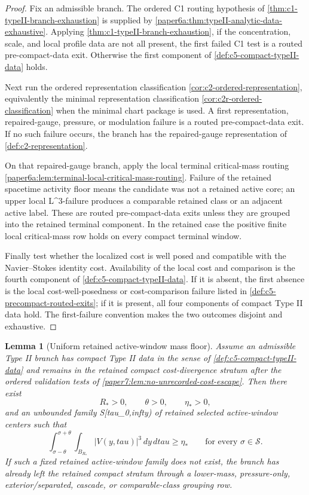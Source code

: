 \documentclass[11pt]{amsart}
\def\({}%
\def\){}%
\def\tau{tau}%
\def\infty{infty}%
\theoremstyle{plain}
\newtheorem{lemma}[lemma]{Lemma}
\theoremstyle{definition}
\theoremstyle{remark}
\begin{document}
\begin{proof}
Fix an admissible branch.  The ordered C1 routing hypothesis of
\cref{thm:c1-typeII-branch-exhaustion} is supplied by
\cref{paper6a:thm:typeII-analytic-data-exhaustive}.  Applying
\cref{thm:c1-typeII-branch-exhaustion}, if the concentration, scale, and local
profile data are not all present, the first failed C1 test is a routed
pre-compact-data exit.  Otherwise the first component of
\cref{def:c5-compact-typeII-data} holds.

Next run the ordered representation classification
\cref{cor:c2-ordered-representation}, equivalently the minimal representation
classification \cref{cor:c2r-ordered-classification} when the minimal chart
package is used.  A first representation, repaired-gauge, pressure, or
modulation failure is a routed pre-compact-data exit.  If no such failure
occurs, the branch has the repaired-gauge representation of
\cref{def:c2-representation}.

On that repaired-gauge branch, apply the local terminal critical-mass routing
\cref{paper6a:lem:terminal-local-critical-mass-routing}.  Failure of the
retained spacetime activity floor means the candidate was not a retained active
core; an upper local
\(L^3\)-failure produces a comparable retained class or an adjacent active
label.  These are routed pre-compact-data exits unless they are grouped into
the retained terminal component.  In the retained case the positive finite
local critical-mass row holds on every compact terminal window.

Finally test whether the localized cost is well posed and compatible with the
Navier--Stokes identity cost.  Availability of the local cost and comparison is
the fourth component of \cref{def:c5-compact-typeII-data}.  If it is absent,
the first absence is the local cost-well-posedness or cost-comparison failure
listed in \cref{def:c5-precompact-routed-exits}; if it is present, all four
components of compact Type II data hold.  The first-failure convention makes
the two outcomes disjoint and exhaustive.
\end{proof}

\begin{lemma}[Uniform retained active-window mass floor]
\label{lem:c5-uniform-retained-active-window-mass}
Assume an admissible Type II branch has compact Type II data in the sense of
\cref{def:c5-compact-typeII-data} and remains in the retained compact
cost-divergence stratum after the ordered validation tests of
\cref{paper7:lem:no-unrecorded-cost-escape}.  Then there exist
\[
  R_*>0,\qquad \theta>0,\qquad \eta_*>0,
\]
and an unbounded family \(\mathcal S\subset[\tau_0,\infty)\) of retained
selected active-window centers such that
\[
  \int_{\sigma-\theta}^{\sigma+\theta}\int_{B_{R_*}}
  |V(y,\tau)|^3\,dy\,d\tau\ge\eta_*
  \qquad\text{for every }\sigma\in\mathcal S .
\]
If such a fixed retained active-window family does not exist, the branch has
already left the retained compact stratum through a lower-mass, pressure-only,
exterior/separated, cascade, or comparable-class grouping row.
\end{lemma}
\end{document}
